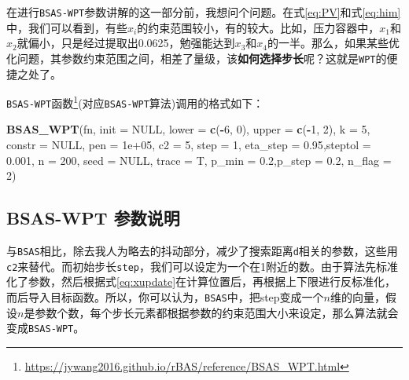 \documentclass[]{ctexbook}
\newenvironment{Shaded}{\begin{snugshade}}{\end{snugshade}}
\newcommand{\KeywordTok}[1]{\textcolor[rgb]{0.13,0.29,0.53}{\textbf{#1}}}
\newcommand{\DataTypeTok}[1]{\textcolor[rgb]{0.13,0.29,0.53}{#1}}
\newcommand{\DecValTok}[1]{\textcolor[rgb]{0.00,0.00,0.81}{#1}}
\newcommand{\FloatTok}[1]{\textcolor[rgb]{0.00,0.00,0.81}{#1}}
\newcommand{\OtherTok}[1]{\textcolor[rgb]{0.56,0.35,0.01}{#1}}
\newcommand{\OperatorTok}[1]{\textcolor[rgb]{0.81,0.36,0.00}{\textbf{#1}}}
\newcommand{\NormalTok}[1]{#1}
\renewcommand{\href}[2]{#2\footnote{\url{#1}}}
\begin{document}
在进行\texttt{BSAS-WPT}参数讲解的这一部分前，我想问个问题。在式\eqref{eq:PV}和式\eqref{eq:him}中，我们可以看到，有些\(x_i\)的约束范围较小，有的较大。比如，压力容器中，\(x_1\)和\(x_2\)就偏小，只是经过提取出0.0625，勉强能达到\(x_3\)和\(x_4\)的一半。那么，如果某些优化问题，其参数约束范围之间，相差了量级，该\textbf{如何选择步长}呢？这就是\texttt{WPT}的便捷之处了。

\href{https://jywang2016.github.io/rBAS/reference/BSAS_WPT.html}{\texttt{BSAS-WPT}函数}(对应\texttt{BSAS-WPT}算法)调用的格式如下：

\begin{Shaded}
\begin{Highlighting}[]
\KeywordTok{BSAS_WPT}\NormalTok{(fn, }
         \DataTypeTok{init =} \OtherTok{NULL}\NormalTok{, }
         \DataTypeTok{lower =} \KeywordTok{c}\NormalTok{(}\OperatorTok{-}\DecValTok{6}\NormalTok{, }\DecValTok{0}\NormalTok{), }\DataTypeTok{upper =} \KeywordTok{c}\NormalTok{(}\OperatorTok{-}\DecValTok{1}\NormalTok{, }\DecValTok{2}\NormalTok{),}
         \DataTypeTok{k =} \DecValTok{5}\NormalTok{, }\DataTypeTok{constr =} \OtherTok{NULL}\NormalTok{, }\DataTypeTok{pen =} \FloatTok{1e+05}\NormalTok{, }
         \DataTypeTok{c2 =} \DecValTok{5}\NormalTok{, }
         \DataTypeTok{step =} \DecValTok{1}\NormalTok{, }\DataTypeTok{eta_step =} \FloatTok{0.95}\NormalTok{,}\DataTypeTok{steptol =} \FloatTok{0.001}\NormalTok{, }
         \DataTypeTok{n =} \DecValTok{200}\NormalTok{, }\DataTypeTok{seed =} \OtherTok{NULL}\NormalTok{, }\DataTypeTok{trace =}\NormalTok{ T, }
         \DataTypeTok{p_min =} \FloatTok{0.2}\NormalTok{,}\DataTypeTok{p_step =} \FloatTok{0.2}\NormalTok{, }\DataTypeTok{n_flag =} \DecValTok{2}\NormalTok{)}
\end{Highlighting}
\end{Shaded}

\subsection{BSAS-WPT 参数说明}\label{bsaswptparms}

与\texttt{BSAS}相比，除去我人为略去的抖动部分，减少了搜索距离\texttt{d}相关的参数，这些用\texttt{c2}来替代。而初始步长\texttt{step}，我们可以设定为一个在1附近的数。由于算法先标准化了参数，然后根据式\eqref{eq:xupdate}在计算位置后，再根据上下限进行反标准化，而后导入目标函数。所以，你可以认为，\texttt{BSAS}中，把step变成一个\(n\)维的向量，假设\(n\)是参数个数，每个步长元素都根据参数的约束范围大小来设定，那么算法就会变成\texttt{BSAS-WPT}。
\end{document}
